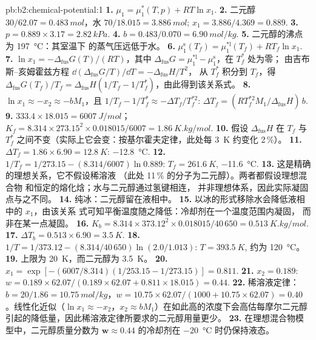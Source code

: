 \begin{solution}{pb:b2:chemical-potential:1}
\textbf{1.} $\mu_1 = \mu_1^*(T, p) + RT\ln x_1$.
\textbf{2.} 二元醇 $30/62.07 = \qty{0.483}{mol}$，水 $70/18.015 =
\qty{3.886}{mol}$; $x_1 = 3.886/4.369 = 0.889$.
\textbf{3.} $p = 0.889 \times 3.17 = \qty{2.82}{kPa}$.
\textbf{4.} $b = 0.483/0.070 = \qty{6.90}{mol/kg}$.
\textbf{5.} 二元醇的沸点为 \qty{197}{\celsius}：其室温下
的蒸气压远低于水。
\textbf{6.} $\mu_1^{\text{s}}(T_f) = \mu_1^{*\text{l}}(T_f) + RT_f\ln x_1$.
\textbf{7.} $\ln x_1 = -\Delta_{\text{fus}}G(T)/(RT)$，其中
$\Delta_{\text{fus}}G = \mu_1^{*\text{l}} - \mu_1^{\text{s}}$，在 $T_f^*$ 处为零；
由吉布斯–亥姆霍兹方程 $\dd(\Delta_{\text{fus}}G/T)/\dd T = -\Delta_{\text{fus}}H/T^2$，
从 $T_f^*$ 积分到 $T_f$，得 $\Delta_{\text{fus}}G(T_f)/T_f =
\Delta_{\text{fus}}H(1/T_f - 1/T_f^*)$，由此得到该关系式。
\textbf{8.} $\ln x_1 \approx -x_2 \approx -bM_1$，且 $1/T_f - 1/T_f^* \approx
-\Delta T_f/T_f^{*2}$: $\Delta T_f = (RT_f^{*2}M_1/\Delta_{\text{fus}}H)\,b$.
\textbf{9.} $333.4 \times 18.015 = \qty{6007}{J/mol}$；$K_f = 8.314 \times
273.15^2 \times 0.018015/6007 = \qty{1.86}{K.kg/mol}$.
\textbf{10.} 假设 $\Delta_{\text{fus}}H$ 在 $T_f$ 与
$T_f^*$ 之间不变（实际上它会变：按基尔霍夫定律，此处每 \qty{3}{K} 约变化 2\,\%）。
\textbf{11.} $\Delta T_f = 1.86 \times 6.90 = \qty{12.8}{K}$: \qty{-12.8}{\celsius}.
\textbf{12.} $1/T_f = 1/273.15 - (8.314/6007)\ln 0.889$: $T_f = \qty{261.6}{K}$,
\qty{-11.6}{\celsius}.
\textbf{13.} 这是精确的理想关系，它不假设稀溶液
（此处 11\,\% 的分子为二元醇）。两者都假设理想混合物
和恒定的熔化焓；水与二元醇通过氢键相连，
并非理想体系，因此实际凝固点与之不同。
\textbf{14.} 纯冰：二元醇留在液相中。
\textbf{15.} 以冰的形式移除水会降低液相中的 $x_1$，由该关系
式可知平衡温度随之降低：冷却剂在一个温度范围内凝固，
而非在某一点凝固。
\textbf{16.} $K_b = 8.314 \times 373.12^2 \times 0.018015/40\,650 =
\qty{0.513}{K.kg/mol}$.
\textbf{17.} $\Delta T_b = 0.513 \times 6.90 = \qty{3.5}{K}$.
\textbf{18.} $1/T = 1/373.12 - (8.314/40\,650)\ln(2.0/1.013)$: $T = \qty{393.5}{K}$,
约为 \qty{120}{\celsius}。
\textbf{19.} 上限为 \qty{20}{K}，而二元醇为 \qty{3.5}{K}。
\textbf{20.} $x_1 = \exp[-(6007/8.314)(1/253.15 - 1/273.15)] = 0.811$.
\textbf{21.} $x_2 = 0.189$: $w = 0.189 \times 62.07/(0.189 \times 62.07 + 0.811
\times 18.015) = 0.44$.
\textbf{22.} 稀溶液定律：$b = 20/1.86 = \qty{10.75}{mol/kg}$，$w = 10.75 \times
62.07/(1000 + 10.75 \times 62.07) = 0.40$。线性化近似（$\ln x_1 \approx
-x_2$，$x_2 \approx bM_1$）在如此高的浓度下会高估每摩尔二元醇
引起的降低量，因此稀溶液定律所要求的二元醇用量更少。
\textbf{23.} 在理想混合物模型中，二元醇质量分数为
$\boldsymbol{w \approx 0.44}$ 的冷却剂在 \qty{-20}{\celsius} 时仍保持液态。
\end{solution}
